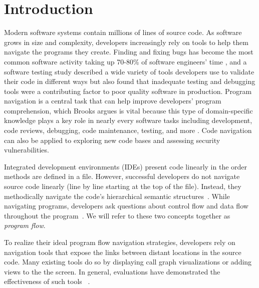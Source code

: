 \documentclass[conference]{IEEEtran}
\begin{document}



\IEEEpeerreviewmaketitle


\section{Introduction}
Modern software systems contain millions of lines of source code. 
As software grows in size and complexity, developers increasingly rely on tools to help them navigate the programs they create. Finding and fixing bugs has become the most common software activity taking up 70-80\% of software engineers' time \cite{Whyline}, and a software testing study described a wide variety of tools developers use to validate their code in different ways but also found that inadequate testing and debugging tools were a contributing factor to poor quality software in production\cite{NIST-02-3}.
Program navigation is a central task that can help improve developers' program comprehension, which Brooks argues is vital because this type of domain-specific knowledge plays a key role in nearly every software tasks including development, code reviews, debugging, code maintenance, testing, and more \cite{BrooksComprehension}. Code navigation can also be applied to exploring new code bases and assessing security vulnerabilities. 

Integrated development environments (IDEs) present code linearly in the order methods are defined in a file. 
However, successful developers do not navigate source code linearly (line by line starting at the top of the file). 
Instead, they methodically navigate the code's hierarchical semantic structures~\cite{robillard2004investigate}.
While navigating programs, developers ask questions about control flow and data flow throughout the program~\cite{latoza2010hard, Smith2015}. 
We will refer to these two concepts together as \textit{program flow}. 

To realize their ideal program flow navigation strategies, developers rely on navigation tools that expose the links between distant locations in the source code. 
Many existing tools do so by displaying call graph visualizations or adding views to the the screen.
In general, evaluations have demonstrated the effectiveness of such tools ~\cite{Reacher,Whyline,Relo,Stacksplorer}.
\end{document}
